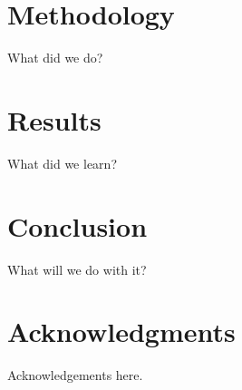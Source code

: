 \documentclass[conference]{IEEEtran}
\begin{document}


\section{Methodology}

What did we do?

\section{Results}

What did we learn?

\section{Conclusion}

What will we do with it?

\section*{Acknowledgments}

Acknowledgements here.



\end{document}
